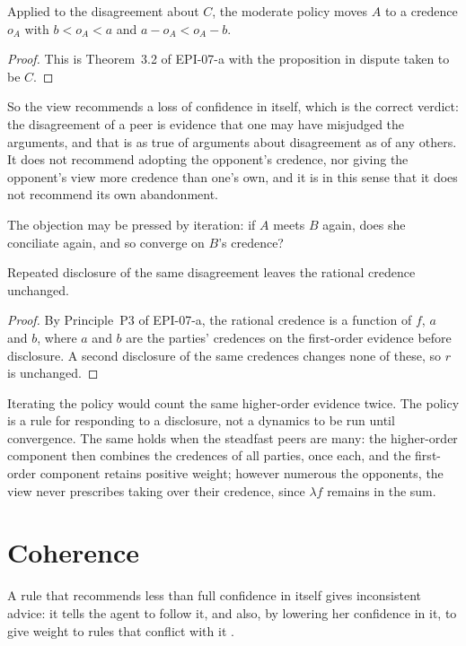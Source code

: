 \documentclass{situationist-preprint}
\begin{document}
\begin{proposition}\label{p:loss}
Applied to the disagreement about $C$, the moderate policy moves $A$ to a credence $o_A$ with $b < o_A < a$ and $a - o_A < o_A - b$.
\end{proposition}

\begin{proof}
This is Theorem~3.2 of EPI-07-a with the proposition in dispute taken to be $C$.
\end{proof}

So the view recommends a loss of confidence in itself, which is the correct verdict: the disagreement of a peer is evidence that one may have misjudged the arguments, and that is as true of arguments about disagreement as of any others. It does not recommend adopting the opponent's credence, nor giving the opponent's view more credence than one's own, and it is in this sense that it does not recommend its own abandonment.

The objection may be pressed by iteration: if $A$ meets $B$ again, does she conciliate again, and so converge on $B$'s credence?

\begin{proposition}\label{p:fixed}
Repeated disclosure of the same disagreement leaves the rational credence unchanged.
\end{proposition}

\begin{proof}
By Principle~P3 of EPI-07-a, the rational credence is a function of $f$, $a$ and $b$, where $a$ and $b$ are the parties' credences on the first-order evidence before disclosure. A second disclosure of the same credences changes none of these, so $r$ is unchanged.
\end{proof}

Iterating the policy would count the same higher-order evidence twice. The policy is a rule for responding to a disclosure, not a dynamics to be run until convergence. The same holds when the steadfast peers are many: the higher-order component then combines the credences of all parties, once each, and the first-order component retains positive weight; however numerous the opponents, the view never prescribes taking over their credence, since $\lambda f$ remains in the sum.

\section{Coherence}

\begin{objection}
A rule that recommends less than full confidence in itself gives inconsistent advice: it tells the agent to follow it, and also, by lowering her confidence in it, to give weight to rules that conflict with it \citep{Elga2010}.
\end{objection}
\end{document}
